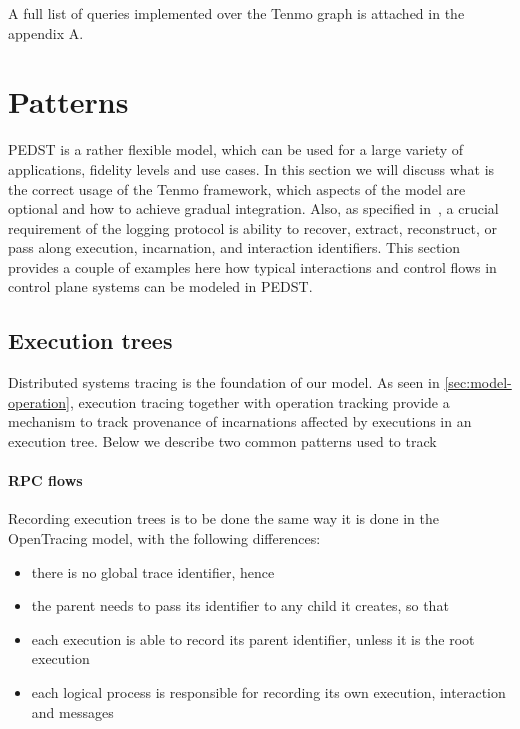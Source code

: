A full list of queries implemented over the Tenmo graph is attached in the appendix A. 

\section{Patterns}\label{sec:patterns}

PEDST is a rather flexible model, which can be used for a large variety of applications, fidelity levels and use cases. In this section we will discuss what is the correct usage of the Tenmo framework, which aspects of the model are optional and how to achieve gradual integration. Also, as specified in~, a crucial requirement of the logging protocol is ability to recover, extract, reconstruct, or pass along execution, incarnation, and interaction identifiers. This section provides a couple of examples here how typical interactions and control flows in control plane systems can be modeled in PEDST.

\subsection{Execution trees}

Distributed systems tracing is the foundation of our model. As seen in \cref{sec:model-operation}, execution tracing together with operation tracking provide a mechanism to track provenance of incarnations affected by executions in an execution tree. Below we describe two common patterns used to track 

\paragraph{RPC flows}

Recording execution trees is to be done the same way it is done in the OpenTracing model, with the following differences:
%
\begin{itemize}
	\item there is no global trace identifier, hence
	\item the parent needs to pass its identifier to any child it creates, so that
	\item each execution is able to record its parent identifier, unless it is the root execution
	\item each logical process is responsible for recording its own execution, interaction and messages
\end{itemize}


